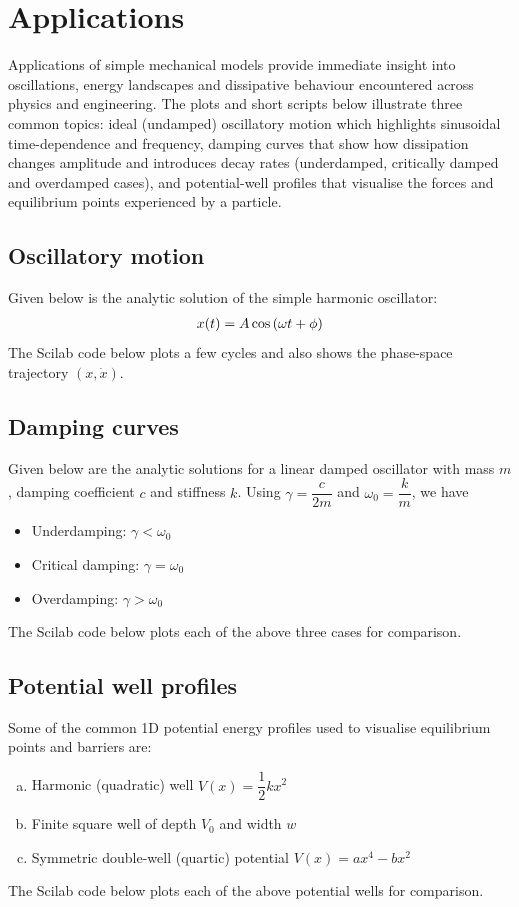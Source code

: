 \section{Applications}
	Applications of simple mechanical models provide immediate insight into oscillations, energy landscapes and dissipative behaviour encountered across physics and engineering. The plots and short scripts below illustrate three common topics: ideal (undamped) oscillatory motion which highlights sinusoidal time-dependence and frequency, damping curves that show how dissipation changes amplitude and introduces decay rates (underdamped, critically damped and overdamped cases), and potential-well profiles that visualise the forces and equilibrium points experienced by a particle.
	
	\subsection{Oscillatory motion}
		Given below is the analytic solution of the simple harmonic oscillator:
		\begin{align*}
			x(t)=A\cos{\qty(\omega t+\phi)}
		\end{align*}
		The Scilab code below plots a few cycles and also shows the phase-space trajectory $(x,\dot{x})$.


	\subsection{Damping curves}
		Given below are the analytic solutions for a linear damped oscillator with mass $m$, damping coefficient $c$ and stiffness $k$. Using $\gamma=\dfrac{c}{2m}$ and $\omega_0=\dfrac{k}{m}$, we have
		\begin{itemize}
			\item Underdamping: $\gamma<\omega_0$
			\item Critical damping: $\gamma=\omega_0$
			\item Overdamping: $\gamma>\omega_0$
		\end{itemize}
		The Scilab code below plots each of the above three cases for comparison.


	\subsection{Potential well profiles}
		Some of the common 1D potential energy profiles used to visualise equilibrium points and barriers are:
		\begin{enumerate}[a)]
			\item Harmonic (quadratic) well $V(x)=\dfrac{1}{2}kx^2$
			\item Finite square well of depth $V_0$ and width $w$
			\item Symmetric double-well (quartic) potential $V(x)=ax^4-bx^2$
		\end{enumerate}
		The Scilab code below plots each of the above potential wells for comparison.
